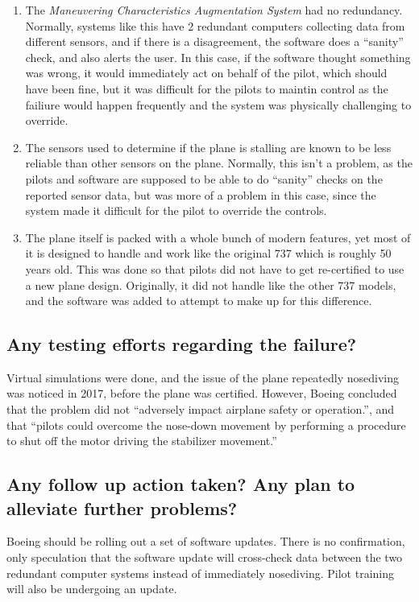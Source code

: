 \documentclass[letterpaper]{article}
\begin{document}
\begin{enumerate}
	\item The \textit{Maneuvering Characteristics Augmentation System} had no redundancy.
	      Normally, systems like this have 2 redundant computers collecting data from different sensors,
	      and if there is a disagreement, the software does a ``sanity'' check, and also alerts the user.
	      In this case, if the software thought something was wrong, it would immediately act on behalf of the pilot,
	      which should have been fine, but it was difficult for the pilots to maintin control as the failiure would happen
	      frequently and the system was physically challenging to override.\cite{verge}

	\item The sensors used to determine if the plane is stalling are known to be less reliable than other sensors on the plane.
	      Normally, this isn't a problem, as the pilots and software are supposed to be able to do ``sanity'' checks
	      on the reported sensor data, but was more of a problem in this case, since the system made it difficult for the pilot to
	      override the controls.\cite{ieeespectrum}

	\item The plane itself is packed with a whole bunch of modern features, yet most of it is designed to handle and work like the
	      original 737 which is roughly 50 years old. This was done so that pilots did not have to get re-certified to use a new plane design.
	      Originally, it did not handle like the other 737 models, and the software was added to attempt to make up for this difference.\cite{verge}

\end{enumerate}


\subsection*{Any testing efforts regarding the failure?}

Virtual simulations were done, and the issue of the plane repeatedly nosediving was noticed in 2017, before the plane was certified.
However, Boeing concluded that the problem did not ``adversely impact airplane safety or operation.'', and that
``pilots could overcome the nose-down movement by performing a procedure to shut off the motor driving the stabilizer movement.''\cite{bloomberg}\cite{goggin_2019}


\subsection*{Any follow up action taken? Any plan to alleviate further problems?}
Boeing should be rolling out a set of software updates\cite{ieeespectrum}\cite{bloomberg}.
There is no confirmation, only speculation that the software update will cross-check data between the two redundant computer systems
instead of immediately nosediving.\cite{ieeespectrum}
Pilot training will also be undergoing an update.\cite{cnn}


\nocite{*}
\printbibliography
\end{document}
